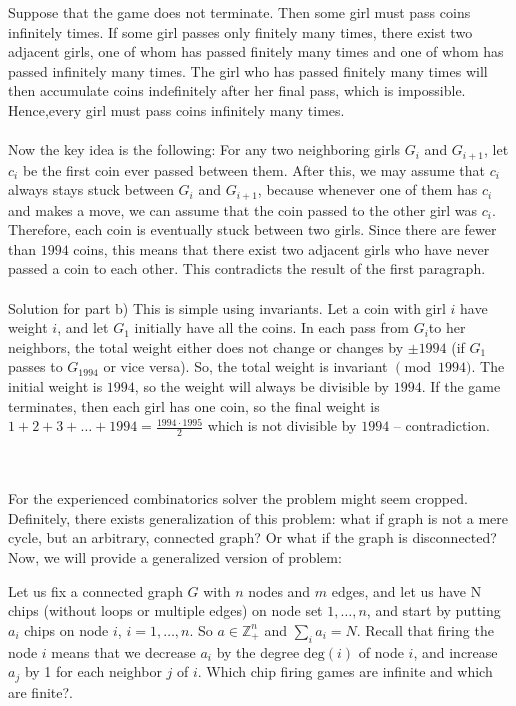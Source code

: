 Suppose that the game does not terminate. Then some girl must pass coins infinitely times. If some girl passes only finitely many times, there exist two adjacent girls, one of whom has passed finitely many times and one of whom has passed infinitely many times. The girl who has passed finitely many times will then accumulate coins indefinitely after her final pass, which is impossible. Hence,every girl must pass coins infinitely many times. 
\\\\
Now the key idea is the following: For any two neighboring girls $G_i$ and $G_{i+1}$, let $c_i$ be the first coin ever passed between them. After this, we may assume that $c_i$ always stays stuck between $G_i$ and $G_{i+1}$, because whenever one of them has $c_i$ and makes a move, we can assume that the coin passed to the other girl was $c_i$. Therefore, each coin is eventually stuck between two girls. Since there are fewer than $1994$ coins, this means that there exist two adjacent girls who have never passed a coin to each other. This contradicts the result of the first paragraph.
\\\\
Solution for part b) This is simple using invariants. Let a coin with girl $i$ have weight $i$, and let $G_1$ initially have all the coins. In each pass from $G_i$to her neighbors, the total weight either does not change or changes by $\pm 1994$ (if $G_1$ passes to $G_{1994}$ or vice versa). So, the total weight is invariant $\pmod{1994}$. The initial weight is $1994$, so the weight will always be divisible by $1994$. If the game terminates, then each girl has one coin, so the final weight is $1+2+3+\dots+1994 = \frac{1994\cdot1995}{2}$ which is not divisible by $1994$ -- contradiction.

\\\\

For the experienced combinatorics solver the problem might seem cropped. Definitely, there exists generalization of this problem: what if graph is not a mere cycle, but an arbitrary, connected graph? Or what if the graph is disconnected? Now, we will provide a generalized version of problem:

\begin{example}
Let us fix a connected graph \( G \) with $n$ nodes and $m$ edges,
and let us have N chips (without loops or multiple edges) on node set \( 1, \dots, n \), and start by putting \( a_i \) chips on node \( i \), \( i = 1, \dots, n \). So \( a \in \mathbb{Z}^n_+ \) and \( \sum_i a_i = N \). Recall that firing the node \( i \) means that we decrease \( a_i \) by the degree \( \text{deg}(i) \) of node \( i \), and increase \( a_j \) by 1 for each neighbor \( j \) of \( i \).  Which chip firing games are infinite and which are finite?.
\end{example}

